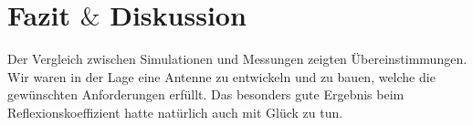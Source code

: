 \section{Fazit $\&$ Diskussion}
Der Vergleich zwischen Simulationen und Messungen zeigten Übereinstimmungen. Wir waren in der Lage eine Antenne zu entwickeln und zu bauen, welche die gewünschten Anforderungen erfüllt. Das besonders gute Ergebnis beim Reflexionskoeffizient hatte natürlich auch mit Glück zu tun.